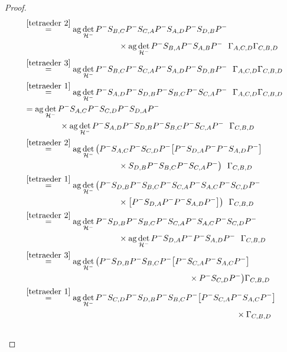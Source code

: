 \documentclass[b5paper,draft,openbib,12pt]{memoir}
\DeclareMathOperator{\ag}{ag}
\begin{document}
\begin{proof}
\begin{align}
&\overset{\eqref{tetraeder 2}}{=}
\ag \det_{\mathcal{H}^-}P^-S_{B,C}P^- S_{C,A}P^-S_{A,D}P^- S_{D,B}P^-\\
&  \hspace{4cm}\times\ag \det_{\mathcal{H}^-} P^- S_{B,A} P^- S_{A,B}P^-  ~~ \Gamma_{A,C,D}\Gamma_{C,B,D}\\
&\overset{\eqref{tetraeder 3}}{=}
\ag \det_{\mathcal{H}^-}P^-S_{B,C}P^- S_{C,A}P^-S_{A,D}P^- S_{D,B}P^-   ~~ \Gamma_{A,C,D}\Gamma_{C,B,D}\\
&\overset{\eqref{tetraeder 1}}{=}
\ag \det_{\mathcal{H}^-}P^-S_{A,D}P^- S_{D,B}P^-S_{B,C}P^- S_{C,A}P^-   ~~ \Gamma_{A,C,D} \Gamma_{C,B,D}\\\notag
&=\ag \det_{\mathcal{H}^-}P^- S_{A,C}P^- S_{C,D}P^- S_{D,A}P^-\\
&\hspace{1.5cm}\times\ag \det_{\mathcal{H}^-}P^-S_{A,D}P^- S_{D,B}P^-S_{B,C}P^- S_{C,A}P^-   ~~ \Gamma_{C,B,D}\\\notag
&\overset{\eqref{tetraeder 2}}{=}
\ag \det_{\mathcal{H}^-}\big(P^- S_{A,C}P^- S_{C,D}P^-\big[ P^- S_{D,A}P^-P^-S_{A,D}P^- \big]\\
&\hspace{4cm}\times  S_{D,B}P^-S_{B,C}P^- S_{C,A}P^-\big)   ~~ \Gamma_{C,B,D}\\\notag
&\overset{\eqref{tetraeder 1}}{=}
\ag \det_{\mathcal{H}^-}\big(P^- S_{D,B}P^-S_{B,C}P^- S_{C,A}P^- S_{A,C}P^- S_{C,D}P^-\\
&\hspace{4cm}\times\big[P^- S_{D,A}P^-P^-S_{A,D}P^- \big]\big)    ~~ \Gamma_{C,B,D}\\\notag
&\overset{\eqref{tetraeder 2}}{=}
\ag \det_{\mathcal{H}^-}P^- S_{D,B}P^-S_{B,C}P^- S_{C,A}P^- S_{A,C}P^- S_{C,D}P^- \\
&\hspace{4cm}\times\ag \det_{\mathcal{H}^-} P^-S_{D,A}P^-P^-S_{A,D}P^-    ~~ \Gamma_{C,B,D}\\\notag
&\overset{\eqref{tetraeder 3}}{=}
\ag \det_{\mathcal{H}^-}\big(P^- S_{D,B}P^-S_{B,C}P^-\big[P^- S_{C,A}P^- S_{A,C}P^-\big]\\
&\hspace{7cm}\times P^- S_{C,D}P^-\big)     \Gamma_{C,B,D}\\\notag
&\overset{\eqref{tetraeder 1}}{=}
\ag \det_{\mathcal{H}^-}P^- S_{C,D}P^- S_{D,B}P^-S_{B,C}P^- \big[P^- S_{C,A}P^- S_{A,C}P^-\big]\\     
&\hspace{9cm}\times \Gamma_{C,B,D}\\\notag

\end{align}
\end{proof}
\end{document}
